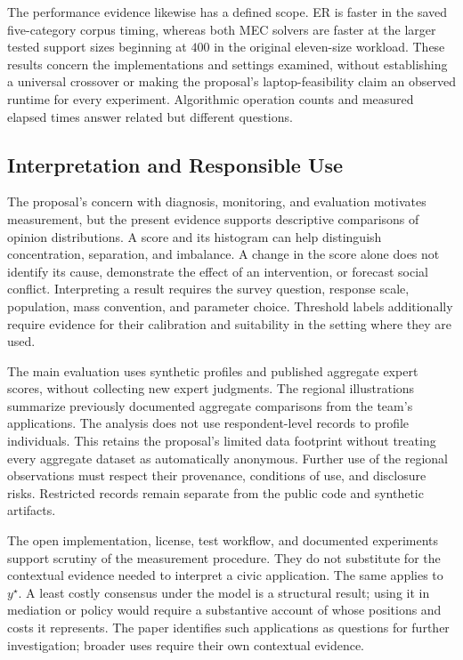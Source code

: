 \documentclass{article}
\theoremstyle{plain}
\theoremstyle{remark}
\begin{document}
The performance evidence likewise has a defined scope. ER is faster in the saved five-category corpus timing, whereas both MEC solvers are faster at the larger tested support sizes beginning at $400$ in the original eleven-size workload. These results concern the implementations and settings examined, without establishing a universal crossover or making the proposal's laptop-feasibility claim an observed runtime for every experiment. Algorithmic operation counts and measured elapsed times answer related but different questions.

\subsection{Interpretation and Responsible Use}\label{sec:ethics}\label{subsec:discussion-use}

The proposal's concern with diagnosis, monitoring, and evaluation motivates measurement, but the present evidence supports descriptive comparisons of opinion distributions. A score and its histogram can help distinguish concentration, separation, and imbalance. A change in the score alone does not identify its cause, demonstrate the effect of an intervention, or forecast social conflict. Interpreting a result requires the survey question, response scale, population, mass convention, and parameter choice. Threshold labels additionally require evidence for their calibration and suitability in the setting where they are used.

The main evaluation uses synthetic profiles and published aggregate expert scores, without collecting new expert judgments. The regional illustrations summarize previously documented aggregate comparisons from the team's applications. The analysis does not use respondent-level records to profile individuals. This retains the proposal's limited data footprint without treating every aggregate dataset as automatically anonymous. Further use of the regional observations must respect their provenance, conditions of use, and disclosure risks. Restricted records remain separate from the public code and synthetic artifacts.

The open implementation, license, test workflow, and documented experiments support scrutiny of the measurement procedure. They do not substitute for the contextual evidence needed to interpret a civic application. The same applies to $y^\star$. A least costly consensus under the model is a structural result; using it in mediation or policy would require a substantive account of whose positions and costs it represents. The paper identifies such applications as questions for further investigation; broader uses require their own contextual evidence.
\end{document}
